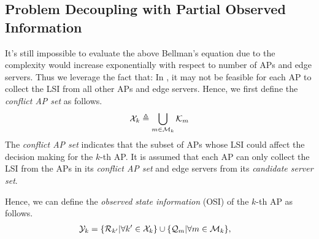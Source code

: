 \subsection{Problem Decoupling with Partial Observed Information}
It's still impossible to evaluate the above Bellman's equation due to the complexity would increase exponentially with respect to number of APs and edge servers.
Thus we leverage the fact that:
In , it may not be feasible for each AP to collect the LSI from all other APs and edge servers.
Hence, we first define the \emph{conflict AP set} as follows.
\begin{align}
    \mathcal{X}_{k} \triangleq \bigcup_{m\in\mathcal{M}_{k}} \mathcal{K}_{m}
\end{align}
The \emph{conflict AP set} indicates that the subset of APs whose LSI could affect the decision making for the $k$-th AP.
It is assumed that each AP can only collect the LSI from the APs in its \emph{conflict AP set} and edge servers from its \emph{candidate server set}.
\begin{definition}
    Hence, we can define the \emph{observed state information} (OSI) of the $k$-th AP as follows.
    \begin{align}
        \mathcal{Y}_{k} &= \{\mathcal{R}_{k'} | \forall k'\in\mathcal{X}_{k}\}
                        \cup \{\mathcal{Q}_{m} | \forall m\in\mathcal{M}_{k}\},
    \end{align}
\end{definition}

